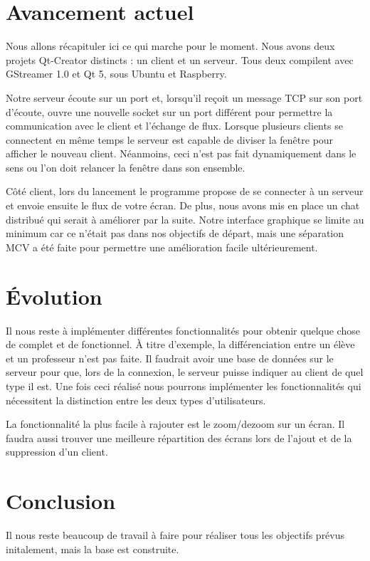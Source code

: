 \documentclass[a4paper, 11pt]{article}
\begin{document}
\section{Avancement actuel}

Nous allons récapituler ici ce qui marche pour le moment. Nous avons deux projets Qt-Creator distincts : un client et un serveur. Tous deux compilent avec GStreamer 1.0 et Qt 5, sous Ubuntu et Raspberry. 

Notre serveur écoute sur un port et, lorsqu'il reçoit un message TCP sur son port d'écoute, ouvre une nouvelle socket sur un port différent pour permettre la communication avec le client et l'échange de flux. Lorsque plusieurs clients se connectent en même temps le serveur est capable de diviser la fenêtre pour afficher le nouveau client. Néanmoins, ceci n'est pas fait dynamiquement dans le sens ou l'on doit relancer la fenêtre dans son ensemble. 

Côté client, lors du lancement le programme propose de se connecter à un serveur et envoie ensuite le flux de votre écran. De plus, nous avons mis en place un chat distribué qui serait à améliorer par la suite. Notre interface graphique se limite au minimum car ce n'était pas dans nos objectifs de départ, mais une séparation MCV a été faite pour permettre une amélioration facile ultérieurement.

\section{Évolution}

Il nous reste à implémenter différentes fonctionnalités pour obtenir quelque chose de complet et de fonctionnel. À titre d'exemple, la différenciation entre un élève et un professeur n'est pas faite. Il faudrait avoir une base de données sur le serveur pour que, lors de la connexion, le serveur puisse indiquer au client de quel type il est. Une fois ceci réalisé nous pourrons implémenter les fonctionnalités qui nécessitent la distinction entre les deux types d'utilisateurs.

La fonctionnalité la plus facile à rajouter est le zoom/dezoom sur un écran. Il faudra aussi trouver une meilleure répartition des écrans lors de l'ajout et de la suppression d'un client.

\section{Conclusion}

Il nous reste beaucoup de travail à faire pour réaliser tous les objectifs prévus initalement, mais la base est construite.

\clearpage
\end{document}
